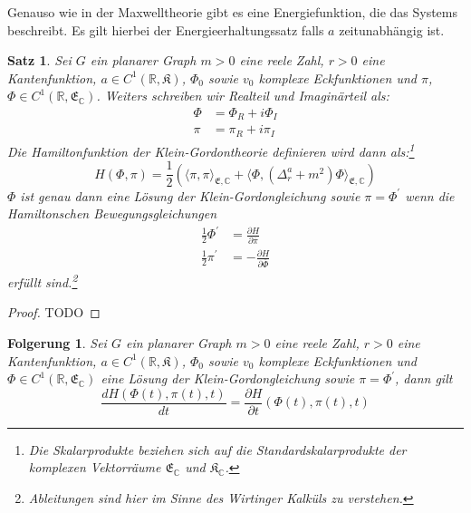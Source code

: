 \documentclass[11pt,a4paper,leqno]{report}
\newtheorem{proposition}{Satz}[chapter]
\newtheorem{corollary}[theorem]{Folgerung}
\numberwithin{equation}{chapter}
\begin{document}
\noindent
Genauso wie in der Maxwelltheorie gibt es eine Energiefunktion, die das Systems beschreibt. Es gilt hierbei der Energieerhaltungssatz falls $a$ zeitunabh\"angig ist.
\begin{proposition}
	Sei $G$ ein planarer Graph $m>0$ eine reele Zahl, $r>0$ eine Kantenfunktion, $a\in C^1(\mathbb{R}, \mathfrak{K})$, $\Phi_0$ sowie $v_0$ komplexe Eckfunktionen und $\pi$, $\Phi\in C^1(\mathbb{R}, \mathfrak{E}_\mathbb{C})$. Weiters schreiben wir Realteil und Imagin\"arteil als:
	\begin{align}
		\Phi &= \Phi_R + i\Phi_I\\
	     \pi &= \pi_R + i\pi_I
	\end{align}
	Die Hamiltonfunktion der Klein-Gordontheorie definieren wird dann als:\footnote{Die Skalarprodukte beziehen sich auf die Standardskalarprodukte der komplexen Vektorr\"aume $\mathfrak{E}_\mathbb{C}$ und $\mathfrak{K}_\mathbb{C}$.}
	\begin{equation}
	H(\Phi, \pi) = \frac{1}{2}(\langle \pi, \pi\rangle_{\mathfrak{E},\mathbb{C}}+\langle \Phi ,(\Delta^{a}_r+ m^2)\Phi\rangle_{\mathfrak{E},\mathbb{C}})
	\end{equation}	
	 $\Phi$ ist genau dann eine L\"osung der Klein-Gordongleichung sowie $\pi=\Phi^\prime$ wenn die Hamiltonschen Bewegungsgleichungen
	\begin{align}
		\frac{1}{2}\Phi^\prime &= \frac{\partial H}{\partial \overline{\pi}}\\
		\frac{1}{2}\pi^\prime &= - \frac{\partial H}{\partial \overline{\Phi}}
	\end{align} erf\"ullt sind.\footnote{Ableitungen sind hier im Sinne des Wirtinger Kalk\"uls zu verstehen.}
\end{proposition}
\begin{proof}
TODO
\end{proof}

\begin{corollary}
Sei $G$ ein planarer Graph $m>0$ eine reele Zahl, $r>0$ eine Kantenfunktion, $a\in C^1(\mathbb{R}, \mathfrak{K})$, $\Phi_0$ sowie $v_0$ komplexe Eckfunktionen und $\Phi\in C^1(\mathbb{R}, \mathfrak{E}_\mathbb{C})$ eine L\"osung der Klein-Gordongleichung sowie $\pi=\Phi^\prime$, dann gilt
\begin{equation}
	\frac{dH(\Phi(t), \pi(t),t)}{dt} = \frac{\partial H}{\partial t}(\Phi(t), \pi(t),t)
\end{equation}
\end{corollary}
\end{document}
